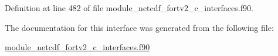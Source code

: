 Definition at line 482 of file module\+\_\+netcdf\+\_\+fortv2\+\_\+c\+\_\+interfaces.\+f90.



The documentation for this interface was generated from the following file\+:\begin{DoxyCompactItemize}
\item 
\hyperlink{module__netcdf__fortv2__c__interfaces_8f90}{module\+\_\+netcdf\+\_\+fortv2\+\_\+c\+\_\+interfaces.\+f90}\end{DoxyCompactItemize}

